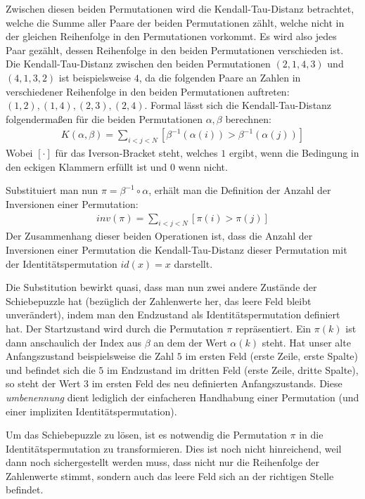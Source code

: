 \documentclass{whswinvcbook}
\begin{document}
Zwischen diesen beiden Permutationen wird die Kendall-Tau-Distanz betrachtet, welche die Summe aller Paare der beiden Permutationen zählt, welche nicht in der gleichen Reihenfolge in den Permutationen vorkommt. Es wird also jedes Paar gezählt, dessen Reihenfolge in den beiden Permutationen verschieden ist. Die Kendall-Tau-Distanz zwischen den beiden Permutationen $(2,1,4,3)$ und $(4,1,3,2)$ ist beispielsweise $4$, da die folgenden Paare an Zahlen in verschiedener Reihenfolge in den beiden Permutationen auftreten: $(1,2),(1,4),(2,3),(2,4)$. Formal lässt sich die Kendall-Tau-Distanz folgendermaßen für die beiden Permutationen $\alpha,\beta$ berechnen:\cite{sedge}
\begin{align}\label{eq-kendall}
    K(\alpha,\beta)=\sum_{i<j<N}\left[\beta^{-1}\left(\alpha\left(i\right)\right)>\beta^{-1}\left(\alpha\left(j\right)\right)\right]
\end{align}
Wobei $[\cdot]$ für das Iverson-Bracket steht, welches $1$ ergibt, wenn die Bedingung in den eckigen Klammern erfüllt ist und $0$ wenn nicht.

Substituiert man nun $\pi=\beta^{-1}\circ\alpha$, erhält man die Definition der Anzahl der Inversionen einer Permutation:\cite{inv}
\begin{align}\label{eq-inv}
    inv(\pi)=\sum_{i<j<N}[\pi(i)>\pi(j)]
\end{align}
Der Zusammenhang dieser beiden Operationen ist, dass die Anzahl der Inversionen einer Permutation die Kendall-Tau-Distanz dieser Permutation mit der Identitätspermutation $id(x)=x$ darstellt.

Die Substitution bewirkt quasi, dass man nun zwei andere Zustände der Schiebepuzzle hat (bezüglich der Zahlenwerte her, das leere Feld bleibt unverändert), indem man den Endzustand als Identitätspermutation definiert hat. Der Startzustand wird durch die Permutation $\pi$ repräsentiert. Ein $\pi(k)$ ist dann anschaulich der Index aus $\beta$ an dem der Wert $\alpha(k)$ steht. Hat unser alte Anfangszustand beispielsweise die Zahl $5$ im ersten Feld (erste Zeile, erste Spalte) und befindet sich die $5$ im Endzustand im dritten Feld (erste Zeile, dritte Spalte), so steht der Wert $3$ im ersten Feld des neu definierten Anfangszustands. Diese \textit{umbenennung} dient lediglich der einfacheren Handhabung einer Permutation (und einer impliziten Identitätspermutation).

Um das Schiebepuzzle zu lösen, ist es notwendig die Permutation $\pi$ in die Identitätspermutation zu transformieren. Dies ist noch nicht hinreichend, weil dann noch sichergestellt werden muss, dass nicht nur die Reihenfolge der Zahlenwerte stimmt, sondern auch das leere Feld sich an der richtigen Stelle befindet.
\end{document}
